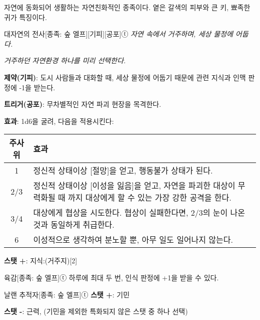 \documentclass{report}
\begin{document}
	자연에 동화되어 생활하는 자연친화적인 종족이다. 옅은 갈색의 피부와 큰 키, 뾰족한 귀가 특징이다.
	
	\begin{story}{대자연의 전사}{[종족: 숲 엘프][기피][공포]ⓣ}
		\textit{자연 속에서 거주하며, 세상 물정에 어둡다.}
		
		\textit{거주하던 자연환경 하나를 미리 선택한다.}
		
		\textbf{제약(기피)}: 도시 사람들과 대화할 때, 세상 물정에 어둡기 때문에 관련 지식과 인맥 판정에 -1을 받는다.
		
		\medskip
		
		\textbf{트리거(공포)}: 무차별적인 자연 파괴 현장을 목격한다.
		
		\textbf{효과}: 1d6을 굴려, 다음을 적용시킨다:
		
		\begin{center}
			\begin{tabularx}{\textwidth}{c|X}
				\textbf{주사위} & \textbf{효과}                                        \\\hline\hline
				1               & 정신적 상태이상 [절망]을 얻고, 행동불가 상태가 된다. \\\hline
				2/3            & 정신적 상태이상 [이성을 잃음]을 얻고, 자연을 파괴한 대상이 무력화될 때 까지 대상에게 할 수 있는 가장 강한 공격을 한다. \\\hline
				3/4            & 대상에게 협상을 시도한다. 협상이 실패한다면, 2/3의 눈이 나온것과 동일하게 취급한다. \\\hline
				6               & 이성적으로 생각하여 분노할 뿐, 아무 일도 일어나지 않는다. \\
			\end{tabularx}
		\end{center}
		
		\textbf{스탯 +}: 지식:(거주지)[2]
		
	\end{story}
	
	\begin{story}{육감}{[종족: 숲 엘프]ⓣ}
		하루에 최대 두 번, 인식 판정에 +1을 받을 수 있다.
		
	\end{story}
	
	\begin{story}{날랜 추적자}{[종족: 숲 엘프]ⓣ}
		\textbf{스탯 +}: 기민
		
		\textbf{스탯 -}: 근력, (기민을 제외한 특화되지 않은 스탯 중 하나 선택)
		
	\end{story}
	
\end{document}
